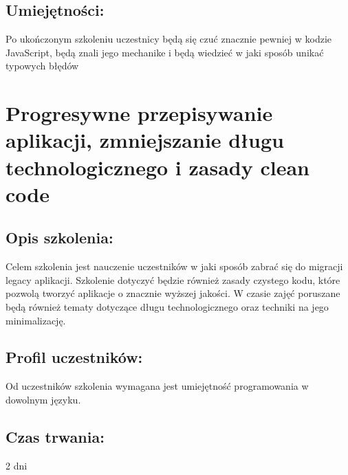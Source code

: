 \documentclass{article}[10pt]
\begin{document}
	\subsection*{Umiejętności:}
\begin{adjustwidth}{2cm}{}
\justifying
	
Po ukończonym szkoleniu uczestnicy będą się czuć znacznie pewniej w kodzie JavaScript, będą znali jego mechanike i będą wiedzieć w jaki sposób unikać typowych błędów

\end{adjustwidth}

\newpage


    
	\section{Progresywne przepisywanie aplikacji, zmniejszanie długu technologicznego i zasady clean code}

	\subsection*{Opis szkolenia:}
	\begin{adjustwidth}{2cm}{}
\justifying
		Celem szkolenia jest nauczenie uczestników w jaki sposób zabrać się do migracji legacy aplikacji.
     Szkolenie dotyczyć będzie również zasady czystego kodu, które pozwolą tworzyć aplikacje o znacznie wyższej jakości. 
     W czasie zajęć poruszane będą również tematy dotyczące długu technologicznego oraz techniki na jego minimalizację.

	\end{adjustwidth}
	\subsection*{Profil uczestników:}
\begin{adjustwidth}{2cm}{}
\justifying
	
Od uczestników szkolenia wymagana jest umiejętność programowania w dowolnym języku.

\end{adjustwidth}
	\subsection*{Czas trwania:}
\begin{adjustwidth}{2cm}{}
	2 dni
\end{adjustwidth}
\end{document}
